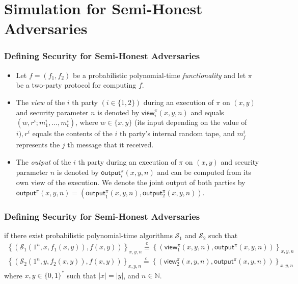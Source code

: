 \documentclass{beamer}
\begin{document}
    \section{Simulation for Semi-Honest Adversaries}
    \sectionpage
    \begin{frame}
        \frametitle{Defining Security for Semi-Honest Adversaries}
        \begin{itemize}
            \item Let $f=\left(f_{1}, f_{2}\right)$ be a probabilistic polynomial-time \emph{functionality} and let $\pi$ be a two-party protocol for computing $f$. 
            \item The \emph{view} of the $i$ th party $(i \in\{1,2\})$ during an execution of $\pi$ on $(x, y)$ and security parameter $n$ is denoted by $\mathsf{view}_{i}^{\pi}(x, y, n)$ and equals $\left(w, r^{i} ; m_{1}^{i}, \ldots, m_{t}^{i}\right)$, where $w \in\{x, y\}$ (its input depending on the value of $i), r^{i}$ equals the contents of the $i$ th party's internal random tape, and $m_{j}^{i}$ represents the $j$ th message that it received.
            \item The \emph{output} of the $i$ th party during an execution of $\pi$ on $(x, y)$ and security parameter $n$ is denoted by $\mathsf{output}_{i}^{\pi}(x, y, n)$ and can be computed from its own view of the execution. We denote the joint output of both parties by $\mathsf{output}^{\pi}(x, y, n)=\left(\right.\mathsf{output}_{1}^{\pi}(x, y, n), \mathsf{output} \left._{2}^{\pi}(x, y, n)\right)$.

    
        \end{itemize}
    
    \end{frame}

    \begin{frame}
        \frametitle{Defining Security for Semi-Honest Adversaries}
        \begin{definition}

            if there exist probabilistic polynomial-time algorithms $\mathcal{S}_{1}$ and $\mathcal{S}_{2}$ such that
            $$
            \begin{array}{l}
            \left\{\left(\mathcal{S}_{1}\left(1^{n}, x, f_{1}(x, y)\right), f(x, y)\right)\right\}_{x, y, n} \stackrel{\mathrm{c}}{\equiv}\left\{\left(\mathsf{view}_{1}^{\pi}(x, y, n), \mathsf{output}^{\pi}(x, y, n)\right)\right\}_{x, y, n}  \\
            \left\{\left(\mathcal{S}_{2}\left(1^{n}, y, f_{2}(x, y)\right), f(x, y)\right)\right\}_{x, y, n} \stackrel{\mathrm{c}}{=}\left\{\left(\mathsf{view}_{2}^{\pi}(x, y, n), \mathsf{output}^{\pi}(x, y, n)\right)\right\}_{x, y, n}
            \end{array}
            $$
            where $x, y \in\{0,1\}^{*}$ such that $|x|=|y|$, and $n \in \mathbb{N}$.
          
            
        \end{definition}
    
        
    
    \end{frame}
\end{document}
